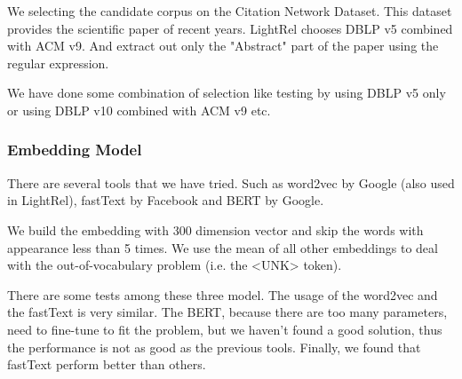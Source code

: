 We selecting the candidate corpus on the Citation Network Dataset. This dataset provides the scientific paper of recent years. LightRel chooses DBLP  v5 combined with ACM v9. And extract out only the "Abstract" part of the paper using the regular expression.

We have done some combination of selection like testing by using DBLP v5 only or using DBLP v10 combined with ACM v9 etc.

\subsubsection{Embedding Model}
\label{sec:embedding_model}

There are several tools that we have tried. Such as word2vec by Google (also used in LightRel), fastText by Facebook and BERT by Google.

We build the embedding with 300 dimension vector and skip the words with appearance less than 5 times. We use the mean of all other embeddings to deal with the out-of-vocabulary problem (i.e. the <UNK> token).

There are some tests among these three model. The usage of the word2vec and the fastText is very similar. The BERT, because there are too many parameters, need to fine-tune to fit the problem, but we haven't found a good solution, thus the performance is not as good as the previous tools. Finally, we found that fastText perform better than others.